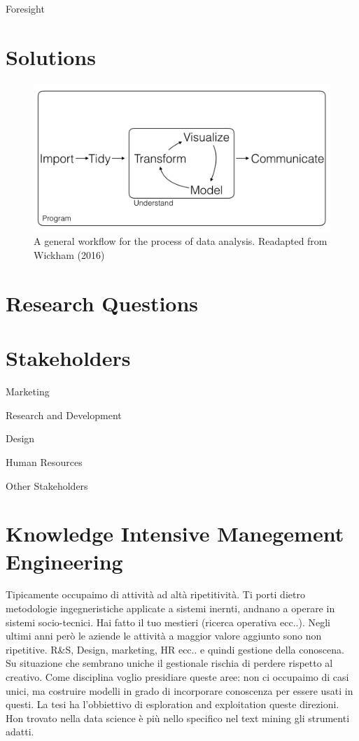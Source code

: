 \documentclass[]{book}
\begin{document}
Foresight

\chapter{Solutions}\label{solutions}

\begin{figure}

{\centering \includegraphics[width=0.8\linewidth]{_bookdown_files/figures/main_work_flow} 

}

\caption{A general workflow for the process of data analysis. Readapted from Wickham (2016)}\label{fig:mainworkflow}
\end{figure}

\chapter{Research Questions}\label{research-questions}

\chapter{Stakeholders}\label{stakeholders}

Marketing

Research and Development

Design

Human Resources

Other Stakeholders

\chapter{Knowledge Intensive Manegement
Engineering}\label{knowledge-intensive-manegement-engineering}

Tipicamente occupaimo di attività ad altà ripetitività. Ti porti dietro
metodologie ingegneristiche applicate a sistemi inernti, andnano a
operare in sistemi socio-tecnici. Hai fatto il tuo mestieri (ricerca
operativa ecc..). Negli ultimi anni però le aziende le attività a
maggior valore aggiunto sono non ripetitive. R\&S, Design, marketing, HR
ecc.. e quindi gestione della conoscena. Su situazione che sembrano
uniche il gestionale rischia di perdere rispetto al creativo. Come
disciplina voglio presidiare queste aree: non ci occupaimo di casi
unici, ma costruire modelli in grado di incorporare conoscenza per
essere usati in questi. La tesi ha l'obbiettivo di esploration and
exploitation queste direzioni. Hon trovato nella data science è più
nello specifico nel text mining gli strumenti adatti.
\end{document}
